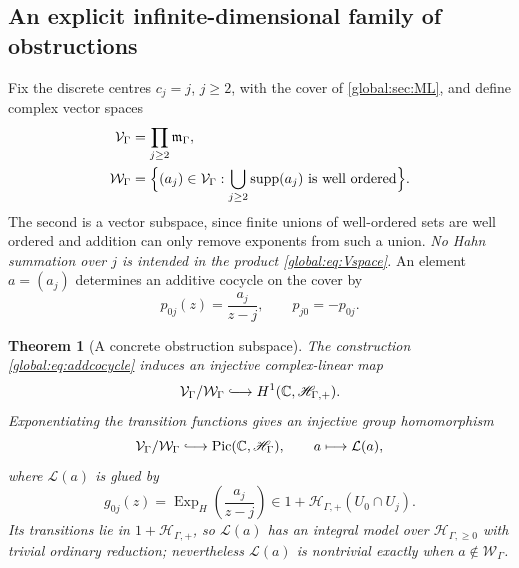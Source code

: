 \documentclass[11pt,letterpaper]{article}
\newtheorem{theorem}{Theorem}[section]
\theoremstyle{definition}
\theoremstyle{remark}
\newcommand{\C}{\mathbb C}
\newcommand{\HH}{\mathscr H_\Gamma}
\newcommand{\HP}{\mathscr H_{\Gamma,+}}
\newcommand{\HI}{\mathscr H_{\Gamma,\ge0}}
\newcommand{\mK}{\mathfrak m_\Gamma}
\newcommand{\supp}{\operatorname{supp}}
\newcommand{\Pic}{\operatorname{Pic}}
\newcommand{\ExpH}{\operatorname{Exp}_{H}}
\numberwithin{equation}{section}
\begin{document}
\subsection{An explicit infinite-dimensional family of obstructions}

Fix the discrete centres $c_j=j$, $j\ge2$, with the cover of \cref{global:sec:ML}, and define complex vector spaces
\begin{align}
  \mathcal V_\Gamma&=\prod_{j\ge2}\mK,\label{global:eq:Vspace}\\
  \mathcal W_\Gamma&=\Bigl\{(a_j)\in\mathcal V_\Gamma:
  \bigcup_{j\ge2}\supp(a_j)\ \text{is well ordered}\Bigr\}.\label{global:eq:Wspace}
\end{align}
The second is a vector subspace, since finite unions of well-ordered sets are well ordered and addition can only remove exponents from such a union. \emph{No Hahn summation over $j$ is intended in the product \eqref{global:eq:Vspace}.} An element $a=(a_j)$ determines an additive cocycle on the cover by
\begin{equation}\label{global:eq:addcocycle}
  p_{0j}(z)=\frac{a_j}{z-j},\qquad p_{j0}=-p_{0j}.
\end{equation}

\begin{theorem}[A concrete obstruction subspace]\label{global:thm:obstruction}
The construction \eqref{global:eq:addcocycle} induces an injective complex-linear map
\begin{equation}\label{global:eq:injH1}
  \mathcal V_\Gamma/\mathcal W_\Gamma
  \lhook\joinrel\longrightarrow H^1(\C,\HP).
\end{equation}
Exponentiating the transition functions gives an injective group homomorphism
\begin{equation}\label{global:eq:injPic}
  \mathcal V_\Gamma/\mathcal W_\Gamma
  \lhook\joinrel\longrightarrow\Pic(\C,\HH),
  \qquad a\longmapsto\mathcal L(a),
\end{equation}
where $\mathcal L(a)$ is glued by
\begin{equation}\label{global:eq:transitions}
  g_{0j}(z)=\ExpH\!\left(\frac{a_j}{z-j}\right)\in1+\HP(U_0\cap U_j).
\end{equation}
Its transitions lie in $1+\HP$, so $\mathcal L(a)$ has an integral model over $\HI$ with trivial ordinary reduction; nevertheless $\mathcal L(a)$ is nontrivial exactly when $a\notin\mathcal W_\Gamma$.
\end{theorem}
\end{document}
